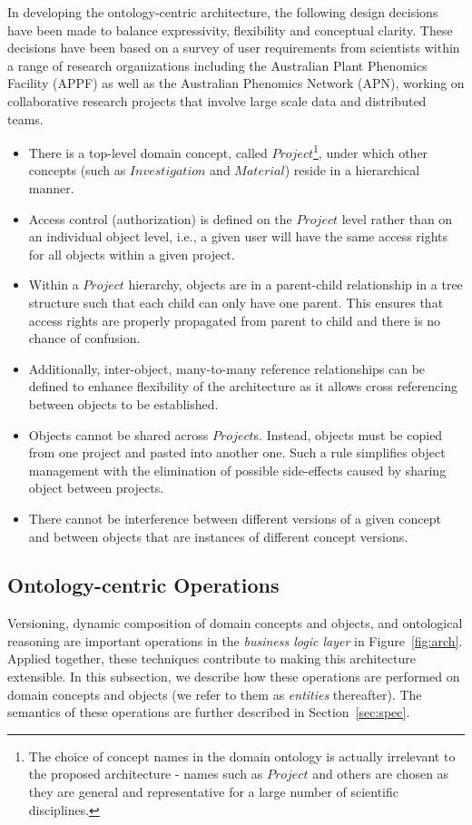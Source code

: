 \documentclass[preprint,12pt]{elsarticle}
\begin{document}
In developing the ontology-centric architecture, the following design decisions have been made to balance expressivity, flexibility and conceptual clarity. These decisions have been based on a survey of user requirements from scientists within a range of research organizations including the Australian Plant Phenomics Facility (APPF) as well as the Australian Phenomics Network (APN), working on collaborative research projects that involve large scale data and distributed teams.

\begin{itemize}
\item There is a top-level domain concept, called $Project$\footnote{The choice of concept names in the domain ontology is actually irrelevant to the proposed architecture - names such as $Project$ and others are chosen as they are general and representative for a large number of scientific disciplines.}, under which other concepts (such as $Investigation$ and $Material$) reside in a hierarchical manner.

\item Access control (authorization) is defined on the $Project$ level rather than on an individual object level, i.e., a given user will have the same access rights for all objects within a given project.
\item Within a $Project$ hierarchy, objects are in a parent-child relationship in a tree structure such that each child can only have one parent. This ensures that access rights are properly propagated from parent to child and there is no chance of confusion.
\item Additionally, inter-object, many-to-many reference relationships can be defined to enhance flexibility of the architecture as it allows cross referencing between objects to be established.
\item Objects cannot be shared across $Project$s. Instead, objects must be copied from one project and pasted into another one. Such a rule simplifies object management with the elimination of possible side-effects caused by sharing object between projects.

\item There cannot be interference between different versions of a given concept and between objects that are instances of different concept versions.
\end{itemize}

\subsection{Ontology-centric Operations}\label{sec:op}
Versioning, dynamic composition of domain concepts and objects, and ontological reasoning are important operations in the \emph{business logic layer} in Figure~\ref{fig:arch}.  Applied together, these techniques contribute to making this architecture extensible. In this subsection, we describe how these operations are performed on domain concepts and objects (we refer to them as \emph{entities} thereafter). The semantics of these operations are further described in Section~\ref{sec:spec}.
\end{document}
